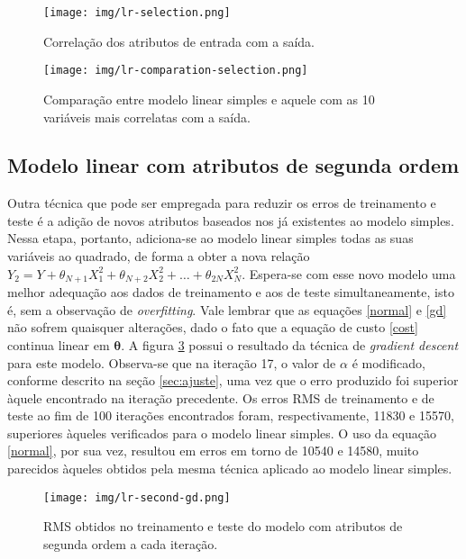 \documentclass[10pt,twocolumn,letterpaper]{article}
\begin{document}
\begin{figure}
    \centering
    \texttt{[image: img/lr-selection.png]}
    \caption{Correlação dos atributos de entrada com a saída.}
    \label{fig:correlation}
\end{figure}

\begin{figure}
    \centering
    \texttt{[image: img/lr-comparation-selection.png]}
    \caption{Comparação entre modelo linear simples e aquele com as 10 variáveis mais correlatas com a saída.}
    \label{fig:comparison-selection}
\end{figure}

\subsection{Modelo linear com atributos de segunda ordem}

Outra técnica que pode ser empregada para reduzir os erros de treinamento e teste é a adição de novos atributos baseados nos já existentes ao modelo simples. Nessa etapa, portanto, adiciona-se ao modelo linear simples todas as suas variáveis ao quadrado, de forma a obter a nova relação \(Y_2 = Y + \theta_{N+1}X_1^2 + \theta_{N+2}X_2^2 + \ldots + \theta_{2N}X_N^2\). Espera-se com esse novo modelo uma melhor adequação aos dados de treinamento e aos de teste simultaneamente, isto é, sem a observação de \textit{overfitting}.  Vale lembrar que as equações \ref{normal} e \ref{gd} não sofrem quaisquer alterações, dado o fato que a equação de custo \ref{cost} continua linear em \(\bm{\theta}\). A figura \ref{fig:gd-second} possui o resultado da técnica de \textit{gradient descent} para este modelo. Observa-se que na iteração 17, o valor de \(\alpha\) é modificado, conforme descrito na seção \ref{sec:ajuste}, uma vez que o erro produzido foi superior àquele encontrado na iteração precedente. Os erros RMS de treinamento e de teste ao fim de 100 iterações encontrados foram, respectivamente, 11830 e 15570, superiores àqueles verificados para o modelo linear simples. O uso da equação \ref{normal}, por sua vez, resultou em erros em torno de 10540 e 14580, muito parecidos àqueles obtidos pela mesma técnica aplicado ao modelo linear simples.

\begin{figure}
    \centering
    \texttt{[image: img/lr-second-gd.png]}
    \caption{RMS obtidos no treinamento e teste do modelo com atributos de segunda ordem a cada iteração.}
    \label{fig:gd-second}
\end{figure}
\end{document}
